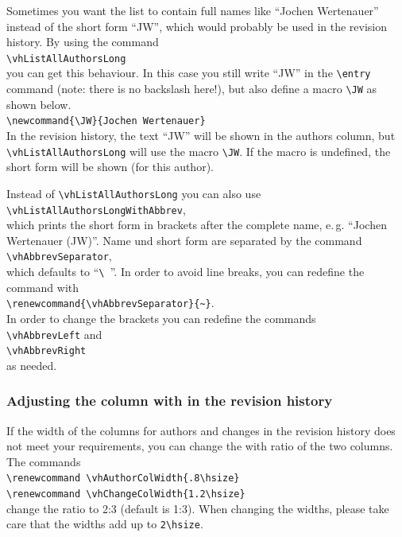 Sometimes you want the list to contain full names like ``Jochen Wer\-ten\-au\-er'' instead of the short form ``JW'', which would probably be used in the revision history. By using the command\\
\mbox{}\hspace{2em}\verb|\vhListAllAuthorsLong|\\
you can get this behaviour. In this case you still write ``JW'' in the \verb|\entry| command (note: there is no backslash here!), but also define a macro \verb|\JW| as shown below.\\
\mbox{}\hspace{2em}\verb|\newcommand{\JW}{Jochen Wertenauer}|\\
In the revision history, the text ``JW'' will be shown in the authors column, but  \verb|\vhListAllAuthorsLong| will use the macro \verb|\JW|. If the macro is undefined, the short form will be shown (for this author).

Instead of \verb|\vhListAllAuthorsLong| you can also use\\
\mbox{}\hspace{2em}\verb|\vhListAllAuthorsLongWithAbbrev|,\\
which prints the short form in brackets after the complete name, e.\,g. ``Jochen Wertenauer (JW)''. Name und short form are separated by the command\\
\mbox{}\hspace{2em}\verb|\vhAbbrevSeparator|,\\
which defaults to ``\verb*|\ |''. In order to avoid line breaks, you can redefine the command with\\
\mbox{}\hspace{2em}\verb|\renewcommand{\vhAbbrevSeparator}{~}|.\\
In order to change the brackets you can redefine the commands\\
\mbox{}\hspace{2em}\verb|\vhAbbrevLeft| and\\
\mbox{}\hspace{2em}\verb|\vhAbbrevRight|\\
as needed.

\subsubsection{Adjusting the column with in the revision history}
If the width of the columns for authors and changes in the revision history does not meet your requirements, you can change the with ratio of the two columns. The commands\\
\mbox{}\hspace{2em}\verb|\renewcommand \vhAuthorColWidth{.8\hsize}|\\
\mbox{}\hspace{2em}\verb|\renewcommand \vhChangeColWidth{1.2\hsize}|\\
change the ratio to 2:3 (default is 1:3). When changing the widths, please take care that the widths add up to \verb|2\hsize|.

